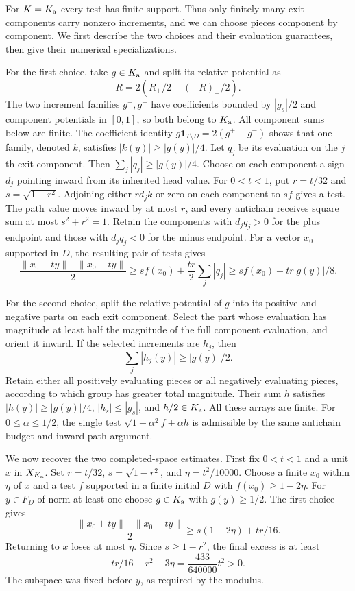 For $K=K_{\rm a}$ every test has finite support. Thus only finitely many
exit components carry nonzero increments, and we can choose pieces
component by component. We first describe the two choices and their
evaluation guarantees, then give their numerical specializations.

For the first choice, take $g\in K_{\rm a}$ and split its relative
potential as
\[
 R=2(R_+/2-(-R)_+/2).
\]
The two increment families $g^+,g^-$ have coefficients bounded by
$|g_s|/2$ and component potentials in $[0,1]$, so both belong to
$K_{\rm a}$. All component sums below are finite. The coefficient identity
$g\mathbf1_{T\setminus D}=2(g^+-g^-)$ shows that one family, denoted
$k$, satisfies $|k(y)|\ge |g(y)|/4$. Let $q_j$ be its evaluation on
the $j$th exit component. Then $\sum_j|q_j|\ge |g(y)|/4$.
Choose on each component a sign $d_j$ pointing inward from its inherited
head value. For $0<t<1$, put $r=t/32$ and $s=\sqrt{1-r^2}$. Adjoining either
$rd_jk$ or zero on each component to $sf$ gives a test. The path value
moves inward by at most $r$, and every antichain receives square sum at
most $s^2+r^2=1$. Retain the components with $d_jq_j>0$ for the plus
endpoint and those with $d_jq_j<0$ for the minus endpoint. For a vector
$x_0$ supported in $D$, the resulting pair of tests gives
\[
 \frac{\|x_0+ty\|+\|x_0-ty\|}{2}
 \ge s f(x_0)+\frac{tr}{2}\sum_j|q_j|
 \ge s f(x_0)+tr|g(y)|/8.
\]

For the second choice, split the relative potential of $g$ into its
positive and negative parts on each exit component. Select the part whose
evaluation has magnitude at least half the magnitude of the full
component evaluation, and orient it inward. If the selected
increments are $h_j$, then
\[
 \sum_j|h_j(y)|\ge |g(y)|/2.
\]
Retain either all positively evaluating pieces or all negatively
evaluating pieces, according to which group has greater total
magnitude. Their sum $h$ satisfies $|h(y)|\ge|g(y)|/4$,
$|h_s|\le|g_s|$, and $h/2\in K_{\rm a}$. All these arrays are finite.
For $0\le\alpha\le1/2$, the single test
$\sqrt{1-\alpha^2}f+\alpha h$ is admissible by the same antichain
budget and inward path argument.

We now recover the two completed-space estimates. First fix $0<t<1$
and a unit $x$ in $X_{K_{\rm a}}$. Set $r=t/32$,
$s=\sqrt{1-r^2}$, and $\eta=t^2/10000$. Choose a finite $x_0$ within
$\eta$ of $x$ and a test $f$ supported in a finite initial $D$ with
$f(x_0)\ge1-2\eta$. For $y\in F_D$ of norm at least one choose
$g\in K_{\rm a}$ with $g(y)\ge1/2$. The first choice gives
\[
 \frac{\|x_0+ty\|+\|x_0-ty\|}{2}
 \ge s(1-2\eta)+tr/16.
\]
Returning to $x$ loses at most $\eta$. Since $s\ge1-r^2$, the final
excess is at least
\begin{equation}\label{eq:antichain-component-bound}
 tr/16-r^2-3\eta=\frac{433}{640000}t^2>0.
\end{equation}
The subspace was fixed before $y$, as required by the modulus.

